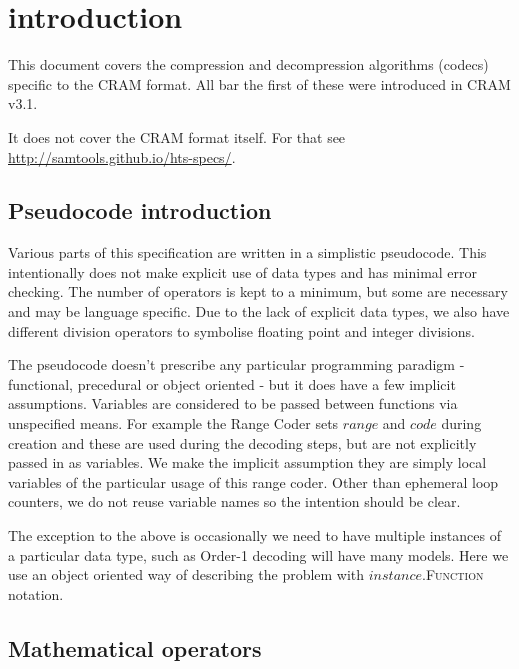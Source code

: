 \documentclass[a4paper]{article}
\begin{document}
\section{introduction}

This document covers the compression and decompression algorithms
(codecs) specific to the CRAM format.  All bar the first of these were
introduced in CRAM v3.1.

It does not cover the CRAM format itself.  For that see \url{http://samtools.github.io/hts-specs/}.

\subsection{Pseudocode introduction}

Various parts of this specification are written in a simplistic
pseudocode.  This intentionally does not make explicit use of data
types and has minimal error checking.  The number of operators is kept
to a minimum, but some are necessary and may be language specific.
Due to the lack of explicit data types, we also have different
division operators to symbolise floating point and integer divisions.

The pseudocode doesn't prescribe any particular programming paradigm -
functional, precedural or object oriented - but it does have a few
implicit assumptions.  Variables are considered to be passed between
functions via unspecified means.  For example the Range Coder sets
$range$ and $code$ during creation and these are used during the
decoding steps, but are not explicitly passed in as variables.  We
make the implicit assumption they are simply local variables of the
particular usage of this range coder.  Other than ephemeral loop
counters, we do not reuse variable names so the intention should be
clear.

The exception to the above is occasionally we need to have multiple
instances of a particular data type, such as Order-1 decoding will
have many models.  Here we use an object oriented way of describing
the problem with $instance$.\textsc{Function} notation.

\subsection{Mathematical operators}
\end{document}

